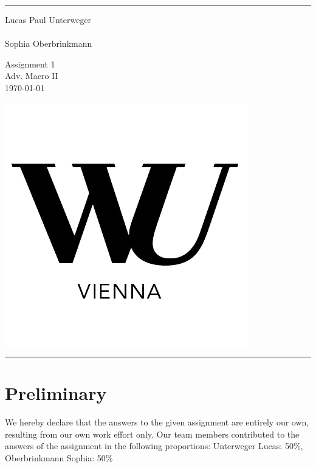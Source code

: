 \documentclass[a4paper,11pt]{article}
\begin{document}

\fancyhead[C]{}
\hrule  %
\begin{minipage}{0.295\textwidth} 
\raggedright
\footnotesize
Lucas Paul Unterweger \hfill\\   
\hfill\\
Sophia Oberbrinkmann
\end{minipage}
\begin{minipage}{0.4\textwidth} 
\centering 
\large 
Assignment 1\\ 
\normalsize 
Adv. Macro II\\ 
\today \\
\end{minipage}
\begin{minipage}{0.295\textwidth} 
\raggedleft
\includegraphics[scale=0.15]{style/wu_transparent.png}\\
\end{minipage}
\hrule 
\bigskip

\section{Preliminary}
We hereby declare that the answers to the given assignment are entirely our own, resulting from our own work effort only. Our team members contributed to the answers of the assignment in the following proportions: Unterweger Lucas: 50\%, Oberbrinkmann Sophia: 50\%
\end{document}
